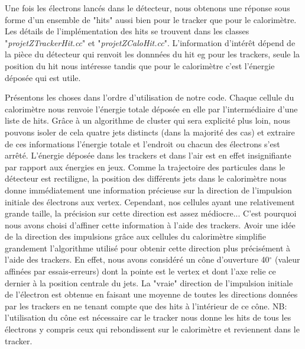 \documentclass[11pt]{article}
\begin{document}
Une fois les électrons lancés dans le détecteur, nous obtenons une réponse sous
forme d'un ensemble de "hits" aussi bien pour le tracker que pour le
calorimètre. Les détails de l'implémentation des hits se trouvent dans les
classes "\textit{projetZTrackerHit.cc}" et "\textit{projetZCaloHit.cc}".
L'information
d'intérêt dépend de la pièce du détecteur qui renvoit les donnnées du  hit eg
pour les trackers, seule la position du hit nous intéresse tandis que pour le
calorimètre c'est l'énergie déposée qui est utile.

Présentons les choses dans l'ordre d'utilisation de notre code. Chaque cellule
du calorimètre nous renvoie l'énergie totale déposée en elle par
l'intermédiaire d'une liste de hits. Grâce à un
algorithme de cluster qui sera explicité plus loin, nous pouvons isoler de
cela quatre jets distincts (dans la majorité des cas) et extraire de ces
informations l'énergie totale et l'endroit ou chacun des électrons s'est
arrêté. L'énergie déposée dans les trackers et dans l'air est en effet
insignifiante par rapport aux énergies en jeux. Comme la trajectoire des
particules dans le détecteur est rectiligne, la position des différents jets
dans le calorimètre nous donne immédiatement une information précieuse sur la
direction de l'impulsion initiale des électrons aux
vertex. Cependant, nos cellules ayant une relativement grande taille, la
précision sur cette direction est assez médiocre... C'est pourquoi nous avons
choisi d'affiner cette information à l'aide des trackers. Avoir une idée de la
direction des impulsions grâce aux cellules du calorimètre simplifie
grandement l'algorithme utilisé pour obtenir cette direction plus précisément à
l'aide des trackers. En effet, nous avons considéré un cône d'ouverture
40$^{\circ}$
(valeur affinées par essais-erreurs) dont la pointe est le vertex et dont l'axe
relie ce dernier à la position centrale du jets. La "vraie" direction de
l'impulsion initiale de l'électron est obtenue en faisant une moyenne de toutes
les directions données par les trackers en ne tenant compte que des hits à
l'intérieur de ce cône. NB: l'utilisation du cône est nécessaire car le
tracker
nous donne les hits de tous les électrons y compris ceux qui rebondissent sur
le calorimètre et reviennent dans le tracker. 
\end{document}
